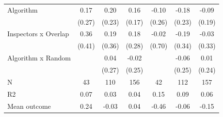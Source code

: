 \begin{tabular}{lccc|ccc}
Algorithm   &        0.17         &        0.20         &        0.16         &       -0.10         &       -0.18         &       -0.09         \\
            &      (0.27)         &      (0.23)         &      (0.17)         &      (0.26)         &      (0.23)         &      (0.19)         \\
\addlinespace
Inspectors x Overlap&        0.36         &        0.19         &        0.18         &       -0.02         &       -0.19         &       -0.03         \\
            &      (0.41)         &      (0.36)         &      (0.28)         &      (0.70)         &      (0.34)         &      (0.33)         \\
\addlinespace
Algorithm x Random&                     &        0.04         &       -0.02         &                     &       -0.06         &        0.01         \\
            &                     &      (0.27)         &      (0.25)         &                     &      (0.25)         &      (0.24)         \\
\midrule
N           &          43         &         110         &         156         &          42         &         112         &         157         \\
R2          &        0.07         &        0.03         &        0.04         &        0.15         &        0.09         &        0.06         \\
Mean outcome&        0.24         &       -0.03         &        0.04         &       -0.46         &       -0.06         &       -0.15         \\
\bottomrule \end{tabular}
